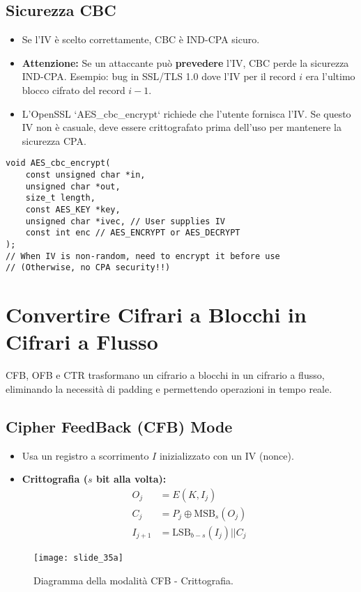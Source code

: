 \documentclass{article}
\begin{document}
\subsection{Sicurezza CBC}
\begin{itemize}
    \item Se l'IV è scelto correttamente, CBC è IND-CPA sicuro.
    \item \textbf{Attenzione:} Se un attaccante può \textbf{prevedere} l'IV, CBC perde la sicurezza IND-CPA. Esempio: bug in SSL/TLS 1.0 dove l'IV per il record $i$ era l'ultimo blocco cifrato del record $i-1$.
    \item L'OpenSSL `AES_cbc_encrypt` richiede che l'utente fornisca l'IV. Se questo IV non è casuale, deve essere crittografato prima dell'uso per mantenere la sicurezza CPA.
\end{itemize}
\begin{verbatim}
void AES_cbc_encrypt(
    const unsigned char *in,
    unsigned char *out,
    size_t length,
    const AES_KEY *key,
    unsigned char *ivec, // User supplies IV
    const int enc // AES_ENCRYPT or AES_DECRYPT
);
// When IV is non-random, need to encrypt it before use
// (Otherwise, no CPA security!!)
\end{verbatim}

\section{Convertire Cifrari a Blocchi in Cifrari a Flusso}
CFB, OFB e CTR trasformano un cifrario a blocchi in un cifrario a flusso, eliminando la necessità di padding e permettendo operazioni in tempo reale.

\subsection{Cipher FeedBack (CFB) Mode}
\begin{itemize}
    \item Usa un registro a scorrimento $I$ inizializzato con un IV (nonce).
    \item \textbf{Crittografia ($s$ bit alla volta):}
    \begin{align*}
        O_j &= E(K, I_j) \\
        C_j &= P_j \oplus \text{MSB}_s(O_j) \\
        I_{j+1} &= \text{LSB}_{b-s}(I_j) || C_j
    \end{align*}
\end{itemize}
\begin{figure}[H]
    \centering
    \texttt{[image: slide\_35a]} %
    \caption{Diagramma della modalità CFB - Crittografia.}
    \label{fig:cfb_encryption}
\end{figure}
\end{document}

